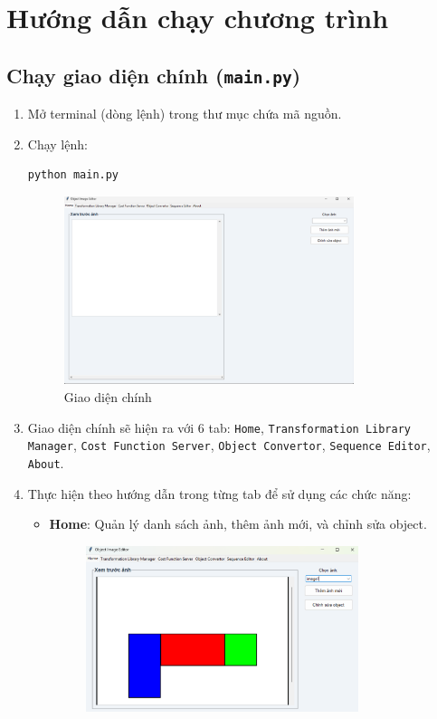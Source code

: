 \documentclass[a4paper,12pt]{article}
\begin{document}
\section{Hướng dẫn chạy chương trình}

\subsection{Chạy giao diện chính (\texttt{main.py})}
\begin{enumerate}
    \item Mở terminal (dòng lệnh) trong thư mục chứa mã nguồn.
    \item Chạy lệnh:
    \begin{lstlisting}[language=bash]
python main.py
    \end{lstlisting}
    \begin{figure}[h]
        \centering
        \includegraphics[width=0.8\textwidth]{home.png}
        \caption{Giao diện chính}
        \label{fig:home_tab}
    \end{figure}
    \item Giao diện chính sẽ hiện ra với 6 tab: \texttt{Home}, \texttt{Transformation Library Manager}, \texttt{Cost Function Server}, \texttt{Object Convertor}, \texttt{Sequence Editor}, \texttt{About}.
    \item Thực hiện theo hướng dẫn trong từng tab để sử dụng các chức năng:
    \begin{itemize}
        \item \textbf{Home}: Quản lý danh sách ảnh, thêm ảnh mới, và chỉnh sửa object.
        \begin{figure}[h]
    \centering
    \includegraphics[width=0.8\textwidth]{home1.png}

\end{figure}
\end{itemize}
\end{enumerate}
\end{document}
